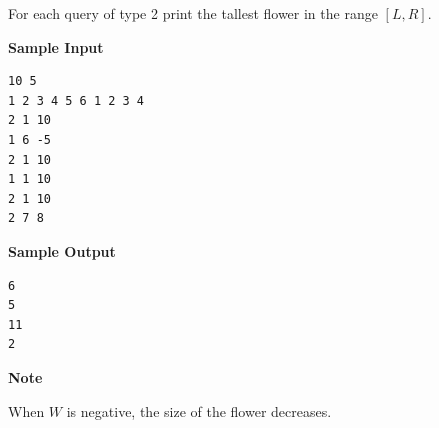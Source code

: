 \documentclass[11pt]{article}
\begin{document}
For each query of type 2 print the tallest flower in the range $[L, R]$.

\textbf{\large Sample Input}

\begin{verbatim}
10 5
1 2 3 4 5 6 1 2 3 4
2 1 10
1 6 -5
2 1 10
1 1 10
2 1 10
2 7 8
\end{verbatim}

\textbf{\large Sample Output}

\begin{verbatim}
6
5
11
2
\end{verbatim}

\textbf{\large Note}

When $W$ is negative, the size of the flower decreases.

\newpage

    
\end{document}
